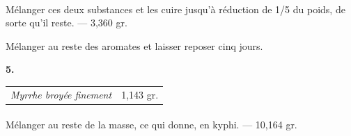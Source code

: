 \documentclass[a4paper, 11pt, oneside, landscape]{article}
\begin{document}
\paragraph{}
Mélanger ces deux substances et les cuire jusqu'à réduction de 1/5 du poids, de sorte qu'il reste. --- 3,360 gr.

Mélanger au reste des aromates et laisser reposer cinq jours.
\begin{center}
\textbf{5.}
\end{center}
\begin{table}[H]
    \centering\bfseries
    \begin{tabular}{l r}
        \emph{Myrrhe broyée finement} & 1,143 gr. \\
    \end{tabular}
\end{table}
\paragraph{}
Mélanger au reste de la masse, ce qui donne, en kyphi. --- 10,164 gr.
\end{document}
